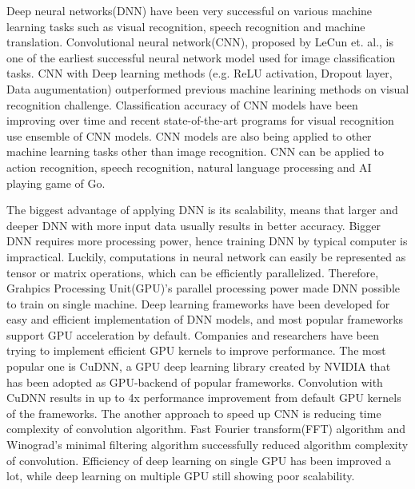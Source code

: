 \documentclass[conference]{IEEEtran}
\begin{document}
Deep neural networks(DNN) have been very successful on various machine learning tasks such as visual recognition, speech recognition and machine translation.
Convolutional neural network(CNN), proposed by LeCun et. al., is one of the earliest successful neural network model used for image classification tasks.
\cite{726791}%
CNN with Deep learning methods (e.g. ReLU activation, Dropout layer, Data augumentation) outperformed previous machine learining methods on visual recognition challenge.
\cite{DBLP:journals/corr/RussakovskyDSKSMHKKBBF14}%
Classification accuracy of CNN models have been improving over time and recent state-of-the-art programs for visual recognition use ensemble of CNN models.
\cite{ILSVRC15}%
CNN models are also being applied to other machine learning tasks other than image recognition. CNN can be applied to action recognition, speech recognition, natural language processing and AI playing game of Go.
\cite{6857341, cite-key , DBLP:journals/corr/KalchbrennerGB14}%

The biggest advantage of applying DNN is its scalability, means that larger and deeper DNN with more input data usually results in better accuracy.
Bigger DNN requires more processing power, hence training DNN by typical computer is impractical.
Luckily, computations in neural network can easily be represented as tensor or matrix operations, which can be efficiently parallelized.
Therefore, Grahpics Processing Unit(GPU)'s parallel processing power made DNN possible to train on single machine.
Deep learning frameworks have been developed for easy and efficient implementation of DNN models, and most popular frameworks support GPU acceleration by default.
\cite{DBLP:journals/corr/Al-RfouAAa16,jia2014caffe,tensorflow2015-whitepaper,torch, cntk} 
Companies and researchers have been trying to implement efficient GPU kernels to improve performance.
The most popular one is CuDNN, a GPU deep learning library created by NVIDIA that has been adopted as GPU-backend of popular frameworks.
\cite{cudnn} %
Convolution with CuDNN results in up to 4x performance improvement from default GPU kernels of the frameworks.
\cite{convnet-benchmarks} %
The another approach to speed up CNN is reducing time complexity of convolution algorithm.
Fast Fourier transform(FFT) algorithm and Winograd's minimal filtering algorithm successfully reduced algorithm complexity of convolution.
\cite{fftconv, winograd, fbfft} %
Efficiency of deep learning on single GPU has been improved a lot, while deep learning on multiple GPU still showing poor scalability.
\cite{DBLP:journals/corr/YadanATR13} %
\end{document}
